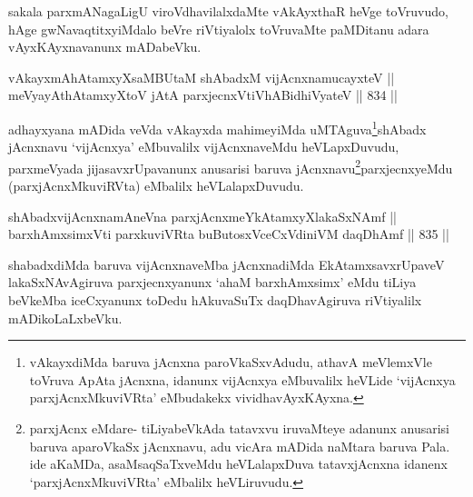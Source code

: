 \begin{artha}
sakala parxmANagaLigU viroVdhavilalxdaMte vAkAyxthaR heVge toVruvudo, hAge gwNavaqtitxyiMdalo beVre riVtiyalolx toVruvaMte paMDitanu adara vAyxKAyxnavanunx mADabeVku.
\end{artha}


\begin{shl}
vAkayxmAhAtamxyXsaMBUtaM shAbadxM vijAcnxnamucayxteV || \\
meVyayAthAtamxyXtoV jAtA parxjecnxVtiVhABidhiVyateV \hfill || 834 ||  
\end{shl}

\begin{artha}
adhayxyana mADida veVda vAkayxda mahimeyiMda uMTAguva\footnote{vAkayxdiMda baruva jAcnxna paroVkaSxvAdudu, athavA meVlemxVle toVruva ApAta jAcnxna, idanunx vijAcnxya eMbuvalilx heVLide `vijAcnxya parxjAcnxMkuviVRta' eMbudakekx vividhavAyxKAyxna.}shAbadx jAcnxnavu `vijAcnxya' eMbuvalilx vijAcnxnaveMdu heVLapxDuvudu, parxmeVyada jijasavxrUpavanunx anusarisi baruva jAcnxnavu\footnote{parxjAcnx eMdare- tiLiyabeVkAda tatavxvu iruvaMteye adanunx anusarisi baruva aparoVkaSx jAcnxnavu, adu vicAra mADida naMtara baruva Pala. ide aKaMDa, asaMsaqSaTxveMdu heVLalapxDuva tatavxjAcnxna idanenx `parxjAcnxMkuviVRta' eMbalilx heVLiruvudu.}parxjecnxyeMdu (parxjAcnxMkuviRVta) eMbalilx heVLalapxDuvudu.
\end{artha}


\begin{shl}
shAbadxvijAcnxnamAneVna parxjAcnxmeYkAtamxyXlakaSxNAmf || \\
barxhAmxsimxVti parxkuviVRta buButosxVceCxVdiniVM daqDhAmf \hfill || 835 ||  
\end{shl}

\begin{artha}
shabadxdiMda baruva vijAcnxnaveMba jAcnxnadiMda EkAtamxsavxrUpaveV lakaSxNAvAgiruva parxjecnxyanunx `ahaM barxhAmxsimx' eMdu tiLiya beVkeMba iceCxyanunx toDedu hAkuvaSuTx daqDhavAgiruva riVtiyalilx mADikoLaLxbeVku.
\end{artha}


